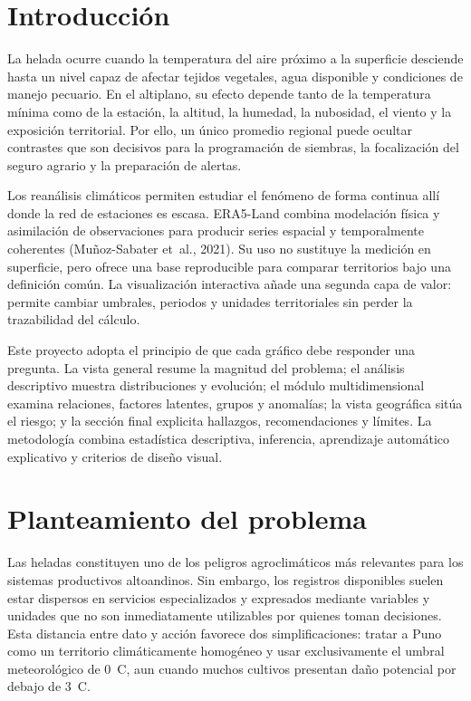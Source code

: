 \documentclass[11pt,a4paper]{article}
\begin{document}
\section{Introducción}

La helada ocurre cuando la temperatura del aire próximo a la superficie desciende hasta
un nivel capaz de afectar tejidos vegetales, agua disponible y condiciones de manejo
pecuario. En el altiplano, su efecto depende tanto de la temperatura mínima como de la
estación, la altitud, la humedad, la nubosidad, el viento y la exposición territorial. Por
ello, un único promedio regional puede ocultar contrastes que son decisivos para la
programación de siembras, la focalización del seguro agrario y la preparación de alertas.

Los reanálisis climáticos permiten estudiar el fenómeno de forma continua allí donde la
red de estaciones es escasa. ERA5-Land combina modelación física y asimilación de
observaciones para producir series espacial y temporalmente coherentes (Muñoz-Sabater
et~al., 2021). Su uso no sustituye la medición en superficie, pero ofrece una base
reproducible para comparar territorios bajo una definición común. La visualización
interactiva añade una segunda capa de valor: permite cambiar umbrales, periodos y unidades
territoriales sin perder la trazabilidad del cálculo.

Este proyecto adopta el principio de que cada gráfico debe responder una pregunta. La
vista general resume la magnitud del problema; el análisis descriptivo muestra
distribuciones y evolución; el módulo multidimensional examina relaciones, factores
latentes, grupos y anomalías; la vista geográfica sitúa el riesgo; y la sección final
explicita hallazgos, recomendaciones y límites. La metodología combina estadística
descriptiva, inferencia, aprendizaje automático explicativo y criterios de diseño visual.

\section{Planteamiento del problema}

Las heladas constituyen uno de los peligros agroclimáticos más relevantes para los
sistemas productivos altoandinos. Sin embargo, los registros disponibles suelen estar
dispersos en servicios especializados y expresados mediante variables y unidades que no
son inmediatamente utilizables por quienes toman decisiones. Esta distancia entre dato y
acción favorece dos simplificaciones: tratar a Puno como un territorio climáticamente
homogéneo y usar exclusivamente el umbral meteorológico de 0~\textdegree C, aun cuando
muchos cultivos presentan daño potencial por debajo de 3~\textdegree C.
\end{document}
